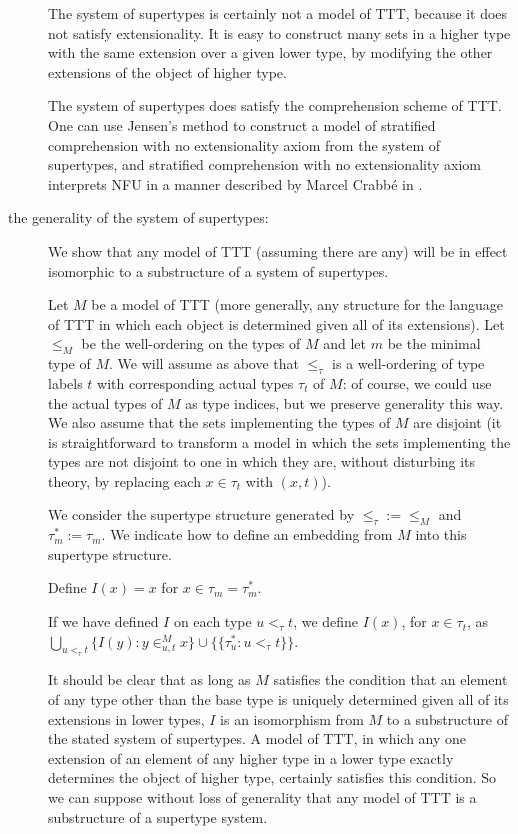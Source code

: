 \documentclass[112pt]{article}
\begin{document}
\begin{description}
The system of supertypes is certainly not a model of TTT, because it does not satisfy extensionality.  It is easy to construct
many sets in a higher type with the same extension over a given lower type, by modifying the other extensions of the object of higher type.

The system of supertypes does satisfy the comprehension scheme of TTT.  One can use Jensen's method to construct a model of stratified comprehension with no extensionality axiom from the system of supertypes, and stratified comprehension with no extensionality axiom interprets NFU in a manner described by Marcel Crabb\'e in \cite{marcelsf}.

\item[the generality of the system of supertypes:]  We show that any model of TTT (assuming there are any) will be in effect isomorphic to a substructure of a system of supertypes.

Let $M$ be a model of TTT (more generally, any structure for the language of TTT in which each object is determined given all of its extensions).  Let $\leq_M$ be the well-ordering on the types of $M$ and let $m$ be the minimal type of $M$.  We will assume as above that $\leq_\tau$ is a well-ordering of type labels $t$ with corresponding actual types $\tau_t$ of $M$:  of course, we could use the actual types of $M$ as type indices, but we preserve generality this way.    We also assume that the sets implementing the types of $M$ are disjoint (it is straightforward to transform a model in which the sets implementing the types are not disjoint to one in which they are, without disturbing its theory, by replacing each $x \in \tau_t$ with $(x,t)$).

We consider the supertype structure generated by $\leq_\tau:=\leq_M$ and $\tau^*_m := \tau_m$.  We indicate how to define an embedding from $M$ into this supertype structure.

Define $I(x) = x$ for $x \in \tau_m = \tau^*_m$.

If we have defined $I$ on each type $u <_\tau t$, we define $I(x)$, for $x \in \tau_t$, as
$\bigcup_{u <_\tau t} \{I(y):y \in^M_{u,t} x\} \cup \{\{\tau^*_u:u <_\tau t\}\}$.

It should be clear that as long as $M$ satisfies the condition that an element of any type other than the base type is uniquely determined given all of its extensions in lower types, $I$ is an isomorphism from $M$ to a substructure of the stated system of supertypes.  A model of TTT, in which any one extension of an element of any higher type in a lower type exactly determines the object of higher type, certainly satisfies this condition.  So we can suppose without loss of generality that any model of TTT is a substructure of a supertype system.


\end{description}
\end{document}
